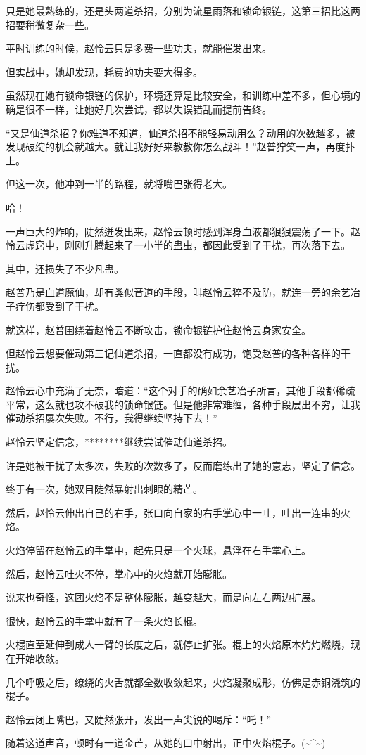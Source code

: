 \begin{this_body}
只是她最熟练的，还是头两道杀招，分别为流星雨落和锁命银链，这第三招比这两招要稍微复杂一些。

平时训练的时候，赵怜云只是多费一些功夫，就能催发出来。

但实战中，她却发现，耗费的功夫要大得多。

虽然现在她有锁命银链的保护，环境还算是比较安全，和训练中差不多，但心境的确是很不一样，让她好几次尝试，都以失误错乱而提前告终。

“又是仙道杀招？你难道不知道，仙道杀招不能轻易动用么？动用的次数越多，被发现破绽的机会就越大。就让我好好来教教你怎么战斗！”赵普狞笑一声，再度扑上。

但这一次，他冲到一半的路程，就将嘴巴张得老大。

哈！

一声巨大的炸响，陡然迸发出来，赵怜云顿时感到浑身血液都狠狠震荡了一下。赵怜云虚窍中，刚刚升腾起来了一小半的蛊虫，都因此受到了干扰，再次落下去。

其中，还损失了不少凡蛊。

赵普乃是血道魔仙，却有类似音道的手段，叫赵怜云猝不及防，就连一旁的余艺冶子疗伤都受到了干扰。

就这样，赵普围绕着赵怜云不断攻击，锁命银链护住赵怜云身家安全。

但赵怜云想要催动第三记仙道杀招，一直都没有成功，饱受赵普的各种各样的干扰。

赵怜云心中充满了无奈，暗道：“这个对手的确如余艺冶子所言，其他手段都稀疏平常，这么就也攻不破我的锁命银链。但是他非常难缠，各种手段层出不穷，让我催动杀招屡次失败。不行，我得继续坚持下去！”

赵怜云坚定信念，********继续尝试催动仙道杀招。

许是她被干扰了太多次，失败的次数多了，反而磨练出了她的意志，坚定了信念。

终于有一次，她双目陡然暴射出刺眼的精芒。

然后，赵怜云伸出自己的右手，张口向自家的右手掌心中一吐，吐出一连串的火焰。

火焰停留在赵怜云的手掌中，起先只是一个火球，悬浮在右手掌心上。

然后，赵怜云吐火不停，掌心中的火焰就开始膨胀。

说来也奇怪，这团火焰不是整体膨胀，越变越大，而是向左右两边扩展。

很快，赵怜云的手掌中就有了一条火焰长棍。

火棍直至延伸到成人一臂的长度之后，就停止扩张。棍上的火焰原本灼灼燃烧，现在开始收敛。

几个呼吸之后，缭绕的火舌就都全数收敛起来，火焰凝聚成形，仿佛是赤铜浇筑的棍子。

赵怜云闭上嘴巴，又陡然张开，发出一声尖锐的喝斥：“吒！”

随着这道声音，顿时有一道金芒，从她的口中射出，正中火焰棍子。(\~{}\^{}\~{})

\end{this_body}

